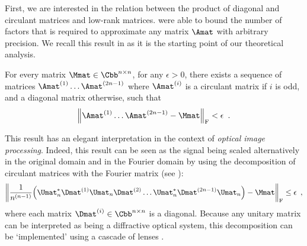 First, we are interested in the relation between the product of diagonal and circulant matrices and low-rank matrices.
\citet{huhtanen2015factoring} were able to bound the number of factors that is required to approximate any matrix $\Amat$ with arbitrary precision.
We recall this result in  as it is the starting point of our theoretical analysis.

\begin{theorem} \label{theorem:ch4-huhtanen}
  For every matrix $\Mmat \in \Cnn$, for any $\epsilon > 0$, there exists a sequence of matrices $\Amat^{(1)} \ldots \Amat^{(2n-1)}$ where $\Amat^{(i)}$ is a circulant matrix if $i$ is odd, and a diagonal matrix otherwise, such that
  \begin{equation}
    \norm{\Amat^{(1)} \ldots \Amat^{(2n-1)} - \Mmat}_\fro < \epsilon \enspace.
  \end{equation}
  \removespace
\end{theorem}

This result has an elegant interpretation in the context of \emph{optical image processing}.
Indeed, this result can be seen as the signal being scaled alternatively in the original domain and in the Fourier domain by using the decomposition of circulant matrices with the Fourier matrix (see ):
\begin{equation}
  \norm{ \frac{1}{n^{(n-1)}} \left( \Umat_n^* \Dmat^{(1)} \Umat_n \Dmat^{(2)} \dots \Umat_n^* \Dmat^{(2n-1)} \Umat_n \right) - \Mmat}_\fro \leq \epsilon \enspace,
\end{equation}
where each matrix $\Dmat^{(i)} \in \Cbb^{n \times n}$ is a diagonal.
Because any unitary matrix can be interpreted as being a diffractive optical system, this decomposition can be `implemented' using a cascade of lenses \cite{muller1998algorithmic}.






